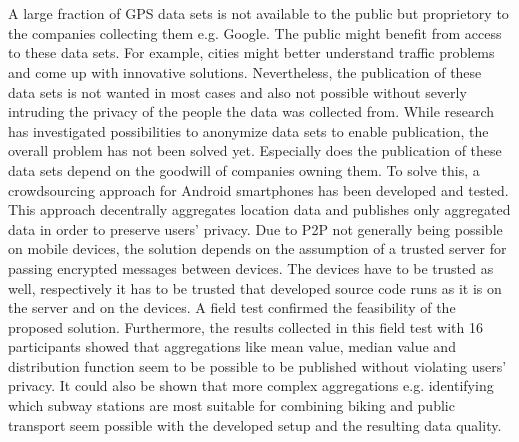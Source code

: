 \chapter{\abstractname}

A large fraction of GPS data sets is not available to the public but proprietory to the companies collecting them e.g. Google. The public might benefit from access to these data sets. For example, cities might better understand traffic problems and come up with innovative solutions. Nevertheless, the publication of these data sets is not wanted in most cases and also not possible without severly intruding the privacy of the people the data was collected from. While research has investigated possibilities to anonymize data sets to enable publication, the overall problem has not been solved yet. Especially does the publication of these data sets depend on the goodwill of companies owning them. To solve this, a crowdsourcing approach for Android smartphones has been developed and tested. This approach decentrally aggregates location data and publishes only aggregated data in order to preserve users' privacy. Due to P2P not generally being possible on mobile devices, the solution depends on the assumption of a trusted server for passing encrypted messages between devices. The devices have to be trusted as well, respectively it has to be trusted that developed source code runs as it is on the server and on the devices. A field test confirmed the feasibility of the proposed solution. Furthermore, the results collected in this field test with 16 participants showed that aggregations like mean value, median value and distribution function seem to be possible to be published without violating users' privacy. It could also be shown that more complex aggregations e.g. identifying which subway stations are most suitable for combining biking and public transport seem possible with the developed setup and the resulting data quality.